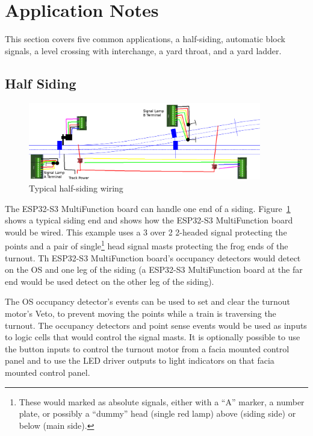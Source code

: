 \clearpage
\section{Application Notes}

This section covers five common applications, a half-siding, automatic block 
signals, a level crossing with interchange, a yard throat, and a yard ladder.

\subsection{Half Siding}
\label{sec:HalfSiding}
\begin{figure}[hbpt]\begin{centering}%
\includegraphics[width=4in]{ESP32S3-ExampleSidingCP1Wiring.png}
\caption{Typical half-siding wiring}
\label{fig:ExampleSidingCP1Wiring}
\end{centering}\end{figure}

The ESP32-S3 MultiFunction board can handle one end of a siding.
Figure~\ref{fig:ExampleSidingCP1Wiring} shows a typical siding end and shows
how the ESP32-S3 MultiFunction board would be wired. This example uses a 3
over 2 2-headed signal protecting the points and a pair of
single\footnote{These would marked as absolute signals, either with a ``A''
marker, a number plate, or possibly a ``dummy'' head (single red lamp) above
(siding side) or below (main side).} head signal masts protecting the frog
ends of the turnout. Th ESP32-S3 MultiFunction board's occupancy detectors
would detect on the OS and one leg of the siding (a ESP32-S3 MultiFunction
board at the far end would be used detect on the other leg of the siding).

The OS occupancy detector's events can be used to set and clear the turnout 
motor's Veto, to prevent moving the points while a train is traversing the 
turnout.  The occupancy detectors and point sense events would be used as 
inputs to logic cells that would control the signal masts.  It is optionally 
possible to use the button inputs to control the turnout motor from a facia 
mounted control panel and to use the LED driver outputs to light indicators on 
that facia mounted control panel.


